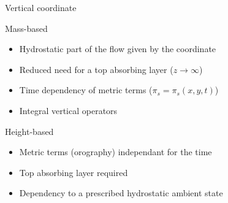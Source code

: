 \documentclass{beamer}
\begin{document}
\begin{frame}{Vertical coordinate}
    \begin{block}{Mass-based}
        \begin{itemize}
            \item[\textcolor{blue}{\faIcon{plus}}] \small Hydrostatic part of the flow given by the coordinate
            \item[\textcolor{blue}{\faIcon{plus}}] \small  Reduced need for a top absorbing layer ($z \rightarrow \infty$) 
            \item[\textcolor{red}{\faIcon{minus}}] \small Time dependency of metric terms ($\pi_s = \pi_s(x, y, t)$)
            \item[\textcolor{red}{\faIcon{minus}}] \small Integral vertical operators
        \end{itemize}
    \end{block}

    \begin{block}{Height-based}
        \begin{itemize}
            \item[\textcolor{blue}{\faIcon{plus}}] \small Metric terms (orography) independant for the time
            \item[\textcolor{red}{\faIcon{minus}}] \small Top absorbing layer required 
            \item[\textcolor{red}{\faIcon{minus}}] \small Dependency to a prescribed hydrostatic ambient state
        \end{itemize}
    \end{block}
\end{frame}
\end{document}
